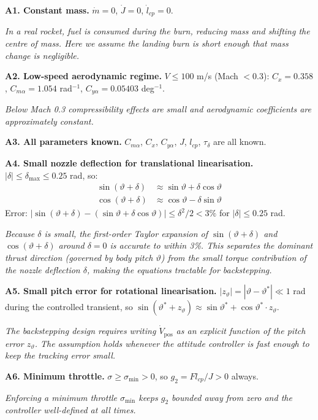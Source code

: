\documentclass[11pt,a4paper]{article}
\theoremstyle{plain}
\theoremstyle{remark}
\newcommand{\vth}{\vartheta}
\newcommand{\vths}{\vartheta^*}
\newcommand{\zth}{z_{\vth}}
\newcommand{\dmax}{\delta_{\max}}
\begin{document}
\textbf{A1. Constant mass.} $\dot m = 0$, $\dot J = 0$, $\dot l_{cp} = 0$.

\textit{In a real rocket, fuel is consumed during the burn, reducing mass and shifting the centre of mass. Here we assume the landing burn is short enough that mass change is negligible.}

\textbf{A2. Low-speed aerodynamic regime.} $V \leq 100$ m/s (Mach $< 0.3$): $C_x = 0.358$, $C_{m\alpha} = 1.054$ rad$^{-1}$, $C_{y\alpha} = 0.05403$ deg$^{-1}$.

\textit{Below Mach 0.3 compressibility effects are small and aerodynamic coefficients are approximately constant.}

\textbf{A3. All parameters known.} $C_{m\alpha}$, $C_x$, $C_{y\alpha}$, $J$, $l_{cp}$, $\tau_\delta$ are all known.

\textbf{A4. Small nozzle deflection for translational linearisation.} $|\delta| \leq \dmax \leq 0.25$ rad, so:
\begin{align}
  \sin(\vth + \delta) &\approx \sin\vth + \delta\cos\vth \\
  \cos(\vth + \delta) &\approx \cos\vth - \delta\sin\vth
\end{align}
Error: $|\sin(\vth+\delta) - (\sin\vth + \delta\cos\vth)| \leq \delta^2/2 < 3\%$ for $|\delta| \leq 0.25$ rad.

\textit{Because $\delta$ is small, the first-order Taylor expansion of $\sin(\vth+\delta)$ and $\cos(\vth+\delta)$ around $\delta=0$ is accurate to within 3\%. This separates the dominant thrust direction (governed by body pitch $\vth$) from the small torque contribution of the nozzle deflection $\delta$, making the equations tractable for backstepping.}

\textbf{A5. Small pitch error for rotational linearisation.} $|\zth| = |\vth - \vths| \ll 1$ rad during the controlled transient, so $\sin(\vths + \zth) \approx \sin\vths + \cos\vths\cdot \zth$.

\textit{The backstepping design requires writing $\dot V_\mathrm{pos}$ as an explicit function of the pitch error $\zth$. The assumption holds whenever the attitude controller is fast enough to keep the tracking error small.}

\textbf{A6. Minimum throttle.} $\sigma \geq \sigma_{\min} > 0$, so $g_2 = F l_{cp}/J > 0$ always.

\textit{Enforcing a minimum throttle $\sigma_{\min}$ keeps $g_2$ bounded away from zero and the controller well-defined at all times.}
\end{document}

